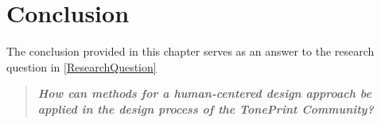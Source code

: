 \chapter{Conclusion}
\label{Conclusion}
%
The conclusion provided in this chapter serves as an answer to the research question in \autoref{ResearchQuestion}


\begin{quote}
	\textbf{\textit{How can methods for a human-centered design approach be applied in the design process of the TonePrint Community?}}
\end{quote}


